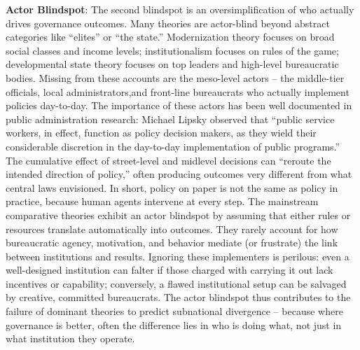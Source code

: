 \textbf{Actor Blindspot}: The second blindspot is an oversimplification of who actually drives governance
outcomes. Many theories are actor-blind beyond abstract categories like “elites” or “the state.”
Modernization theory focuses on broad social classes and income levels; institutionalism focuses on
rules of the game; developmental state theory focuses on top leaders and high-level bureaucratic bodies.
Missing from these accounts are the meso-level actors – the middle-tier officials, local administrators,and front-line bureaucrats who actually implement policies day-to-day. The importance of these actors
has been well documented in public administration research: Michael Lipsky observed that “public
service workers, in effect, function as policy decision makers, as they wield their considerable discretion
in the day-to-day implementation of public programs.” The cumulative effect of street-level and midlevel
decisions can “reroute the intended direction of policy,” often producing outcomes very different
from what central laws envisioned. In short, policy on paper is not the same as policy in practice, because
human agents intervene at every step. The mainstream comparative theories exhibit an actor blindspot
by assuming that either rules or resources translate automatically into outcomes. They rarely account
for how bureaucratic agency, motivation, and behavior mediate (or frustrate) the link between
institutions and results. Ignoring these implementers is perilous: even a well-designed institution can
falter if those charged with carrying it out lack incentives or capability; conversely, a flawed institutional
setup can be salvaged by creative, committed bureaucrats. The actor blindspot thus contributes to the
failure of dominant theories to predict subnational divergence – because where governance is better,
often the difference lies in who is doing what, not just in what institution they operate.

